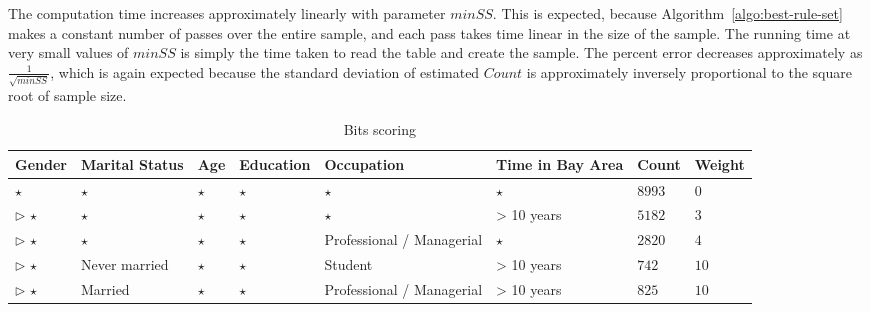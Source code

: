 The computation time increases approximately linearly with parameter $minSS$. This is expected, because Algorithm~\ref{algo:best-rule-set} makes a constant number of passes over the entire sample, and each pass takes time linear in the size of the sample. The running time at very small values of $minSS$ is simply the time taken to read the table and create the sample. The percent error decreases approximately as $\frac{1}{\sqrt{minSS}}$, which is again expected because the standard deviation of estimated $Count$ is approximately inversely proportional to the square root of sample size.

\begin{table} 
\scriptsize
\centering 
\begin{tabular}{| p{1.5cm} | p{1.5cm} | p{1.5cm} | p{1.5cm} | p{1.5cm} | p{1.5cm} | l | l |} 
\hline Gender & Marital Status & Age & Education & Occupation & Time in Bay Area & Count & Weight \\ \hline 
\cline{1-8} $\star$ & $\star$ & $\star$ & $\star$ & $\star$ & $\star$ & $8993$ & $0$ \\
\cline{1-1} \cline{2-2} \cline{3-3} \cline{4-4} \cline{5-5} \cline{6-6} \cline{7-8} $\triangleright$ $\star$ & $\star$ & $\star$ & $\star$ & $\star$ & > 10 years & $5182$ & $3$ \\
\cline{1-1} \cline{2-2} \cline{3-3} \cline{4-4} \cline{5-5} \cline{6-6} \cline{7-8} $\triangleright$ $\star$ & $\star$ & $\star$ & $\star$ & Professional / Managerial & $\star$ & $2820$ & $4$ \\
\cline{1-1} \cline{2-2} \cline{3-3} \cline{4-4} \cline{5-5} \cline{6-6} \cline{7-8} $\triangleright$ $\star$ & Never married & $\star$ & $\star$ & Student & > 10 years & $742$ & $10$ \\
\cline{1-1} \cline{2-2} \cline{3-3} \cline{4-4} \cline{5-5} \cline{6-6} \cline{7-8} $\triangleright$ $\star$ & Married & $\star$ & $\star$ & Professional / Managerial & > 10 years & $825$ & $10$ \\
\hline 
\end{tabular} 
\vspace{-10pt}
\caption{Bits scoring\label{table:weigtingbitwise}} 
\vspace{-10pt}
\end{table} 

